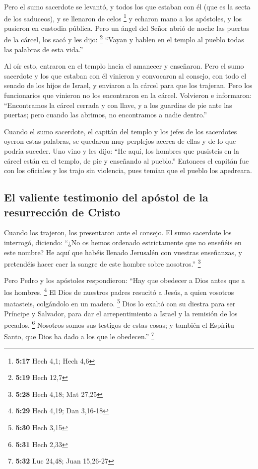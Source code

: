 \begin{paracol}{2}
 Pero el sumo sacerdote se levantó, y todos los que
estaban con él (que es la secta de los saduceos), y se llenaron de celos
\footnote{\textbf{5:17} Hech 4,1; Hech 4,6}  y echaron
mano a los apóstoles, y los pusieron en custodia pública.
 Pero un ángel del Señor abrió de noche las puertas de la
cárcel, los sacó y les dijo: \footnote{\textbf{5:19} Hech 12,7}
 ``Vayan y hablen en el templo al pueblo todas las
palabras de esta vida.''

 Al oír esto, entraron en el templo hacia el amanecer y
enseñaron. Pero el sumo sacerdote y los que estaban con él vinieron y
convocaron al consejo, con todo el senado de los hijos de Israel, y
enviaron a la cárcel para que los trajeran.  Pero los
funcionarios que vinieron no los encontraron en la cárcel. Volvieron e
informaron:  ``Encontramos la cárcel cerrada y con llave,
y a los guardias de pie ante las puertas; pero cuando las abrimos, no
encontramos a nadie dentro.''

 Cuando el sumo sacerdote, el capitán del templo y los
jefes de los sacerdotes oyeron estas palabras, se quedaron muy perplejos
acerca de ellas y de lo que podría suceder.  Uno vino y
les dijo: ``He aquí, los hombres que pusisteis en la cárcel están en el
templo, de pie y enseñando al pueblo.''  Entonces el
capitán fue con los oficiales y los trajo sin violencia, pues temían que
el pueblo los apedreara.

\hypertarget{el-valiente-testimonio-del-apuxf3stol-de-la-resurrecciuxf3n-de-cristo}{%
\subsection{El valiente testimonio del apóstol de la resurrección de
Cristo}\label{el-valiente-testimonio-del-apuxf3stol-de-la-resurrecciuxf3n-de-cristo}}

 Cuando los trajeron, los presentaron ante el consejo. El
sumo sacerdote los interrogó,  diciendo: ``¿No os hemos
ordenado estrictamente que no enseñéis en este nombre? He aquí que
habéis llenado Jerusalén con vuestras enseñanzas, y pretendéis hacer
caer la sangre de este hombre sobre nosotros.'' \footnote{\textbf{5:28}
  Hech 4,18; Mat 27,25}

 Pero Pedro y los apóstoles respondieron: ``Hay que
obedecer a Dios antes que a los hombres. \footnote{\textbf{5:29} Hech
  4,19; Dan 3,16-18}  El Dios de nuestros padres resucitó
a Jesús, a quien vosotros matasteis, colgándolo en un madero.
\footnote{\textbf{5:30} Hech 3,15}  Dios lo exaltó con su
diestra para ser Príncipe y Salvador, para dar el arrepentimiento a
Israel y la remisión de los pecados. \footnote{\textbf{5:31} Hech 2,33}
 Nosotros somos sus testigos de estas cosas; y también el
Espíritu Santo, que Dios ha dado a los que le obedecen.'' \footnote{\textbf{5:32}
  Luc 24,48; Juan 15,26-27}


\end{paracol}
